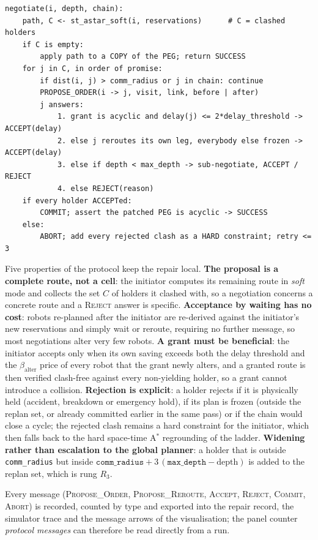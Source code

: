 \documentclass[10pt,a4paper]{article}
\newcommand{\code}[1]{\texttt{#1}}
\begin{document}
\begin{lstlisting}[style=algo]
negotiate(i, depth, chain):
    path, C <- st_astar_soft(i, reservations)      # C = clashed holders
    if C is empty:
        apply path to a COPY of the PEG; return SUCCESS
    for j in C, in order of promise:
        if dist(i, j) > comm_radius or j in chain: continue
        PROPOSE_ORDER(i -> j, visit, link, before | after)
        j answers:
            1. grant is acyclic and delay(j) <= 2*delay_threshold -> ACCEPT(delay)
            2. else j reroutes its own leg, everybody else frozen -> ACCEPT(delay)
            3. else if depth < max_depth -> sub-negotiate, ACCEPT / REJECT
            4. else REJECT(reason)
    if every holder ACCEPTed:
        COMMIT; assert the patched PEG is acyclic -> SUCCESS
    else:
        ABORT; add every rejected clash as a HARD constraint; retry <= 3
\end{lstlisting}
Five properties of the protocol keep the repair local.
\textbf{The proposal is a complete route, not a cell}: the initiator computes
its remaining route in \emph{soft} mode and collects the set $C$ of holders
it clashed with, so a negotiation concerns a concrete route and a
\textsc{Reject} answer is specific.  \textbf{Acceptance by waiting has no
cost}: robots re-planned after the initiator are re-derived against the
initiator's new reservations and simply wait or reroute, requiring no further
message, so most negotiations alter very few robots.  \textbf{A
grant must be beneficial}: the initiator accepts only when its own saving
exceeds both the delay threshold and the $\beta_{\text{alter}}$ price of
every robot that the grant newly alters, and a granted route is then verified
clash-free against every non-yielding holder, so a grant cannot introduce a
collision.  \textbf{Rejection is explicit}: a holder rejects if it is
physically held (accident, breakdown or emergency hold), if its plan is
frozen (outside the replan set, or already committed earlier in the same
pass) or if the chain would close a cycle; the rejected clash remains a hard
constraint for the initiator, which then falls back to the hard space-time
A$^\ast$ regrounding of the ladder.  \textbf{Widening rather than escalation
to the global planner}: a holder that is outside \code{comm\_radius} but
inside $\code{comm\_radius} + 3\,(\code{max\_depth}-\text{depth})$ is added
to the replan set, which is rung $R_3$.

Every message (\textsc{Propose\_Order}, \textsc{Propose\_Reroute},
\textsc{Accept}, \textsc{Reject}, \textsc{Commit}, \textsc{Abort}) is
recorded, counted by type and exported into the repair record, the simulator
trace and the message arrows of the visualisation; the panel counter
\emph{protocol messages} can therefore be read directly from a run.
\end{document}
